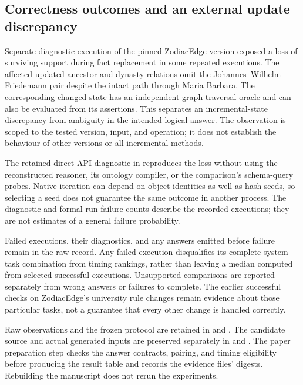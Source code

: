 \subsection{Correctness outcomes and an external update discrepancy}




Separate diagnostic execution of the pinned ZodiacEdge version exposed a
loss of surviving support during fact replacement in some repeated executions.
The affected updated ancestor and dynasty relations omit the
Johannes--Wilhelm Friedemann pair despite the intact path through Maria
Barbara. The corresponding changed state has an independent graph-traversal
oracle and can also be evaluated from its assertions. This separates an
incremental-state discrepancy from ambiguity in the intended logical answer.
The observation is scoped to the tested version, input, and operation; it
does not establish the behaviour of other versions or all incremental methods.

The retained direct-API diagnostic in
 reproduces the loss
without using the reconstructed reasoner, its ontology compiler, or the
comparison's schema-query probes. Native iteration can depend on object
identities as well as hash seeds, so selecting a seed does not guarantee the
same outcome in another process. The diagnostic and formal-run failure counts
describe the recorded executions; they are not estimates of a general failure
probability.

Failed executions, their diagnostics, and any answers emitted before failure
remain in the raw record. Any failed execution disqualifies its complete
system--task combination from timing rankings, rather than leaving a median
computed from selected successful executions. Unsupported comparisons are
reported separately from wrong answers or failures to complete. The earlier
successful checks on ZodiacEdge's university rule changes remain evidence
about those particular tasks, not a guarantee that every other change is
handled correctly.

Raw observations and the frozen protocol are retained in
 and
.
The candidate source and actual generated inputs are preserved separately in
 and
.
The paper preparation step checks the answer contracts, pairing, and timing
eligibility before producing the result table and records the evidence files'
digests. Rebuilding the manuscript does not rerun the experiments.
